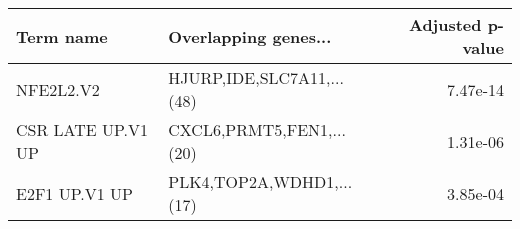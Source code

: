 \begin{tabular}{llr}
\toprule
        Term name &      Overlapping genes... &  Adjusted p-value \\
\midrule
        NFE2L2.V2 & HJURP,IDE,SLC7A11,...(48) &          7.47e-14 \\
CSR LATE UP.V1 UP &  CXCL6,PRMT5,FEN1,...(20) &          1.31e-06 \\
    E2F1 UP.V1 UP &  PLK4,TOP2A,WDHD1,...(17) &          3.85e-04 \\
\bottomrule
\end{tabular}
